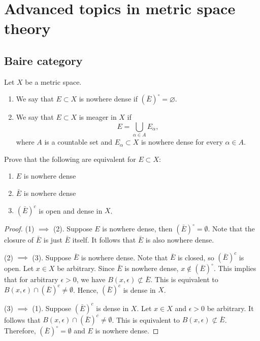 \documentclass[a4paper]{article}
\begin{document}
\maketitle

\tableofcontents

\section{Advanced topics in metric space theory}

\subsection{Baire category}

\begin{defi}
Let $X$ be a metric space.  
\begin{enumerate}
 \item We say that $E \subset X$ is nowhere dense if 
 $(\bar{E})^\circ = \varnothing$.
 \item We say that $E \subset X$ is meager in $X$ if 
\begin{equation*}
 E = \bigcup_{\alpha \in A} E_\alpha,
\end{equation*}
where $A$ is a countable set and $E_\alpha \subset X$ 
is nowhere dense for every $\alpha \in A$.
\end{enumerate}
\end{defi}

\begin{thm}
Prove that the following are equivalent for  
$E \subset X$:
\begin{enumerate}
 \item $E$ is nowhere dense
 \item $\bar{E}$ is nowhere dense
 \item $(\bar{E})^c$ is open and dense in $X$.
\end{enumerate}
\end{thm}

\begin{proof}
  (1) $\implies$ (2). Suppose $E$ is nowhere dense, then 
  $(\bar{E})^\circ = \emptyset$. Note that the closure 
  of $\bar{E}$ is just $\bar{E}$ itself. It follows that 
  $\bar{E}$ is also nowhere dense. 
  
  (2) $\implies$ (3). Suppose $\bar{E}$ is nowhere dense.
  Note that $\bar{E}$ is closed, so $(\bar{E})^c$ is open.
  Let $x \in X$ be arbitrary. Since $\bar{E}$ is nowhere dense,
  $x \notin (\bar{E})^\circ$. This implies that for arbitrary 
  $\epsilon > 0$, we have $B(x, \epsilon) \nsubset \bar{E}$.
  This is equivalent to $B(x, \epsilon) \cap (\bar{E})^c \neq 
  \emptyset$. Hence, $(\bar{E})^c$ is dense in $X$. 

  (3) $\implies$ (1). Suppose $(\bar{E})^c$ is dense in $X$. 
  Let $x \in X$ and $\epsilon > 0$ be arbitrary. It follows 
  that $B(x, \epsilon) \cap (\bar{E})^c \neq \emptyset$. 
  This is equivalent to $B(x, \epsilon) \nsubset \bar{E}$. 
  Therefore, $(\bar{E})^\circ = \emptyset$ and $E$ is nowhere 
  dense.

\end{proof}
\end{document}
